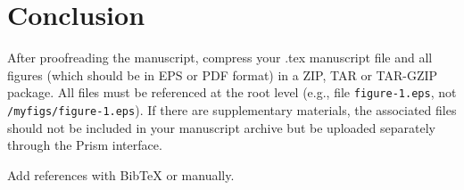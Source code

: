 \documentclass{optica-article}
\begin{document}
\section{Conclusion}
After proofreading the manuscript, compress your .tex manuscript file and all figures (which should be in EPS or PDF format) in a ZIP, TAR or TAR-GZIP package. All files must be referenced at the root level (e.g., file \texttt{figure-1.eps}, not \texttt{/myfigs/figure-1.eps}). If there are supplementary materials, the associated files should not be included in your manuscript archive but be uploaded separately through the Prism interface.


Add references with BibTeX or manually.
\cite{Zhang:14,OPTICA,FORSTER2007,Dean2006,testthesis,Yelin:03,Masajada:13,codeexample}







\end{document}
